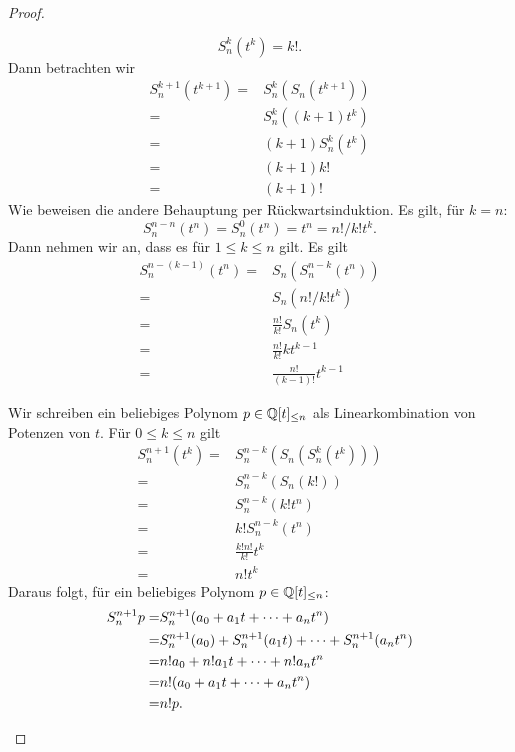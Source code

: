 \begin{proof}
\begin{parts}
		\[
		S_n^k(t^k)=k!
		.\]
		Dann betrachten wir
		\begin{align*}
			S_n^{k+1}(t^{k+1})=&S_n^k(S_n(t^{k+1}))\\
			=& S_n^k((k+1)t^k)\\
			=&(k+1)S_n^k(t^k)\\
			=&(k+1)k!\\
			=&(k+1)!
		\end{align*}
		Wie beweisen die andere Behauptung per Rückwartsinduktion. Es gilt, f\"{u}r $k=n$:
		\[
			S_n^{n-n}(t^n)=S_n^0(t^n)=t^n=n! / k! t^k
		.\] 
		Dann nehmen wir an, dass es f\"{u}r $1\le k\le n$ gilt. Es gilt
		\begin{align*}
			S_n^{n-(k-1)}(t^n)=&S_n(S_n^{n-k}(t^n))\\
			=&S_n(n! / k! t^k)\\
			=&\frac{n!}{k!}S_n(t^k)\\
			=&\frac{n!}{k!}kt^{k-1}\\
			=&\frac{n!}{(k-1)!}t^{k-1}
		\end{align*}
	\item Wir schreiben ein beliebiges Polynom $p\in \mathbb{Q}[t]_{\le n}$ als Linearkombination von Potenzen von $t$. F\"{u}r $0\le k\le n$ gilt
	\begin{align*}
		S_n^{n+1}(t^k)=&S_n^{n-k}(S_n(S_n^k(t^k)))\\
		=&S_n^{n-k}(S_n(k!))\\
		=&S_n^{n-k}(k! t^n)\\
		=&k! S_n^{n-k}(t^n)\\
		=&\frac{k!n!}{k!}t^k\\
		=&n!t^k
	\end{align*}
	Daraus folgt, f\"{u}r ein beliebiges Polynom $p\in\mathbb{Q}[t]_{\le n}$:
	\begin{align*}
		S_n^{n+1}p=&S_n^{n+1}(a_0+a_1t+\dots+a_n t^n)\\
		=& S_n^{n+1}(a_0)+S_n^{n+1}(a_1t)+\dots+S_n^{n+1}(a_nt^n)\\
		=&n!a_0+n!a_1t+\dots+n!a_nt^n\\
		=&n!(a_0+a_1t+\dots+a_n t^n)\\
		=&n!p.\qedhere
	\end{align*}
	\end{parts}
\end{proof}
